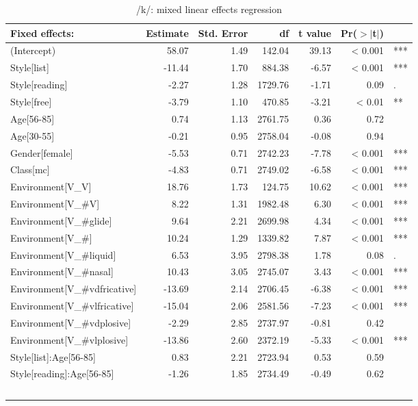 {\footnotesize
	\begin{longtable}[c]{p{}rrrrrl}
				\caption{/k/: mixed linear effects regression}\label{tab.regression.k}\\
		\hline
		Fixed effects: & Estimate & Std. Error & df & t value & Pr($>$$|$t$|$) & \\
		\hline
		(Intercept) & 58.07 & 1.49 & 142.04 & 39.13 & < 0.001 & *** \\ 
		Style[list] & -11.44 & 1.70 & 884.38 & -6.57 & < 0.001 & *** \\ 
		Style[reading] & -2.27 & 1.28 & 1729.76 & -1.71 & 0.09 & . \\ 
		Style[free] & -3.79 & 1.10 & 470.85 & -3.21 & < 0.01 & ** \\ 
		Age[56-85] & 0.74 & 1.13 & 2761.75 & 0.36 & 0.72 & \\ 
		Age[30-55] & -0.21 & 0.95 & 2758.04 & -0.08 & 0.94 & \\ 
		Gender[female] & -5.53 & 0.71 & 2742.23 & -7.78 & < 0.001 & *** \\ 
		Class[mc] & -4.83 & 0.71 & 2749.02 & -6.58 & < 0.001 & *** \\ 
		Environment[V\_V] & 18.76 & 1.73 & 124.75 & 10.62 & < 0.001 & *** \\ 
		Environment[V\_\#V] & 8.22 & 1.31 & 1982.48 & 6.30 & < 0.001 & *** \\ 
		Environment[V\_\#glide] & 9.64 & 2.21 & 2699.98 & 4.34 & < 0.001 & *** \\ 
		Environment[V\_\#] & 10.24 & 1.29 & 1339.82 & 7.87 & < 0.001 & *** \\ 
		Environment[V\_\#liquid] & 6.53 & 3.95 & 2798.38 & 1.78 & 0.08 & . \\ 
		Environment[V\_\#nasal] & 10.43 & 3.05 & 2745.07 & 3.43 & < 0.001 & *** \\ 
		Environment[V\_\#vdfricative] & -13.69 & 2.14 & 2706.45 & -6.38 & < 0.001 & *** \\ 
		Environment[V\_\#vlfricative] & -15.04 & 2.06 & 2581.56 & -7.23 & < 0.001 & *** \\ 
		Environment[V\_\#vdplosive] & -2.29 & 2.85 & 2737.97 & -0.81 & 0.42 & \\ 
		Environment[V\_\#vlplosive] & -13.86 & 2.60 & 2372.19 & -5.33 & < 0.001 & *** \\ 
		Style[list]:Age[56-85] & 0.83 & 2.21 & 2723.94 & 0.53 & 0.59 & \\ 
		Style[reading]:Age[56-85] & -1.26 & 1.85 & 2734.49 & -0.49 & 0.62 & \\ 
$$
\end{longtable}}
